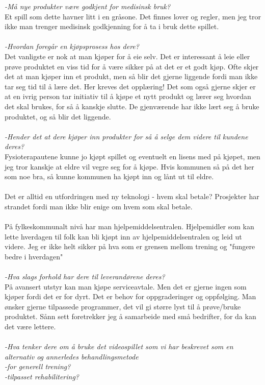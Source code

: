 \emph{-Må nye produkter være godkjent for medisinsk bruk?}\\ 
Et spill som dette havner litt i en gråsone. Det finnes lover og regler, men jeg tror ikke man trenger medisinsk godkjenning for å ta i bruk dette spillet.\\ \\
\emph{-Hvordan foregår en kjøpsprosess hos dere?} \\ 
Det vanligste er nok at man kjøper for å eie selv. Det er interessant å leie eller prøve produktet en viss tid for å være sikker på at det er et godt kjøp. Ofte skjer det at man kjøper inn et produkt, men så blir det gjerne liggende fordi man ikke tar seg tid til å lære det. Her kreves det opplæring! Det som også gjerne skjer er at en ivrig person tar initiativ til å kjøpe et nytt produkt og lærer seg hvordan det skal brukes, for så å kanskje slutte. De gjenværende har ikke lært seg å bruke produktet, og så blir det liggende. \\ \\
\emph{-Hender det at dere kjøper inn produkter for så å selge dem videre til kundene deres?}\\ 
Fysioterapautene kunne jo kjøpt spillet og eventuelt en lisens med på kjøpet, men jeg tror kanskje at eldre vil vegre seg for å kjøpe. Hvis kommunen så på det her som noe bra, så kunne kommunen ha kjøpt inn og lånt ut til eldre. \\ \\ Det er alltid en utfordringen med ny teknologi - hvem skal betale? Prosjekter har strandet fordi man ikke blir enige om hvem som skal betale.\\ \\ På fylkeskommunalt nivå har man hjelpemiddelsentralen. Hjelpemidler som kan lette hverdagen til folk kan bli kjøpt inn av hjelpemiddelsentralen og leid ut videre. Jeg er ikke helt sikker på hva som er grensen mellom trening og "fungere bedre i hverdagen" \\ \\
\emph{-Hva slags forhold har dere til leverandørene deres?} \\ 
På avansert utstyr kan man kjøpe serviceavtale. Men det er gjerne ingen som kjøper fordi det er for dyrt. Det er behov for oppgraderinger og oppfølging. Man ønsker gjerne tilpassede programmer, det vil gi større lyst til å prøve/bruke produktet. Sånn sett foretrekker jeg å samarbeide med små bedrifter, for da kan det være lettere.\\ \\ 
\emph{-Hva tenker dere om å bruke det videospillet som vi har beskrevet som en alternativ og annerledes behandlingsmetode \\
-for generell trening?\\
-tilpasset rehabilitering?}\\ 
